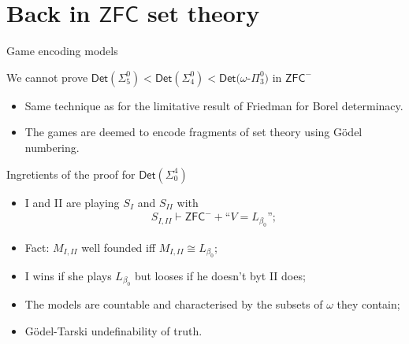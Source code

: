 \documentclass{beamer} %
\begin{document}

\section{Back in \texorpdfstring{$\mathsf{ZFC}$}{ZFC} set theory}

\begin{frame}{Game encoding models}
    \begin{theorem}
        We cannot prove $\mathsf{Det}(\Sigma_5^0)<\mathsf{Det}(\Sigma_4^0)
        <\mathsf{Det}(\omega$-$\Pi_3^0)$ in $\mathsf{ZFC^-}$ 
    \end{theorem}

    \begin{itemize}
        \item<2-> Same technique as for the limitative result of Friedman for 
            Borel determinacy.
        \item<3-> The games are deemed to encode fragments of set theory using Gödel numbering.
    \end{itemize}
\end{frame}


\begin{frame}{Ingretients of the proof for $\mathsf{Det}(\Sigma_0^4)$}
    \begin{itemize}
        \item I and II are playing $S_I$ and $S_{II}$ with \begin{align*}
            S_{I,II} \vdash \mathsf{ZFC}^- + \text{``$V=L_{\beta_0}$''};
        \end{align*}
        \item Fact: $M_{I,II}$ well founded iff $M_{I,II} \cong L_{\beta_0}$;
        \item I wins if she plays $L_{\beta_0}$ but looses if he doesn't byt II does;
        \item The models are countable and characterised by the subsets of $\omega$ they 
        contain;
        \item Gödel-Tarski undefinability of truth.
    \end{itemize}
\end{frame}

\end{document}
